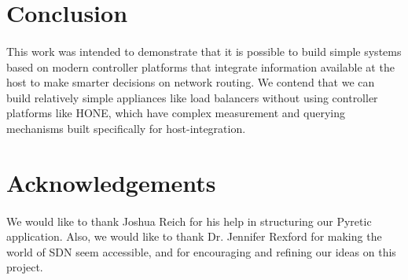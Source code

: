 \documentclass[10pt]{article}
\begin{document}
\section{Conclusion}
\label{sec:conclusion}

\paragraph{} This work was intended to demonstrate that it is possible to build simple systems based on modern controller platforms that integrate information available at the host to make smarter decisions on network routing. We contend that we can build relatively simple appliances like load balancers without using controller platforms like HONE, which have complex measurement and querying mechanisms built specifically for host-integration.

\section{Acknowledgements}

\paragraph{} We would like to thank Joshua Reich for his help in structuring our Pyretic application. Also, we would like to thank Dr. Jennifer Rexford for making the world of SDN seem accessible, and for encouraging and refining our ideas on this project.

{}

\end{document}
